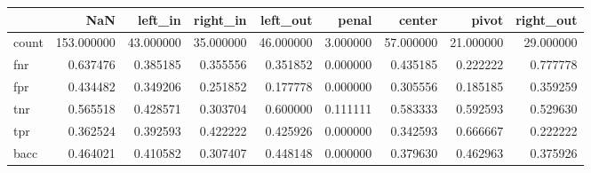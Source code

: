 \begin{tabular}{lrrrrrrrr}
\toprule
{} &         NaN &    left\_in &   right\_in &   left\_out &     penal &     center &      pivot &  right\_out \\
\midrule
count &  153.000000 &  43.000000 &  35.000000 &  46.000000 &  3.000000 &  57.000000 &  21.000000 &  29.000000 \\
fnr   &    0.637476 &   0.385185 &   0.355556 &   0.351852 &  0.000000 &   0.435185 &   0.222222 &   0.777778 \\
fpr   &    0.434482 &   0.349206 &   0.251852 &   0.177778 &  0.000000 &   0.305556 &   0.185185 &   0.359259 \\
tnr   &    0.565518 &   0.428571 &   0.303704 &   0.600000 &  0.111111 &   0.583333 &   0.592593 &   0.529630 \\
tpr   &    0.362524 &   0.392593 &   0.422222 &   0.425926 &  0.000000 &   0.342593 &   0.666667 &   0.222222 \\
bacc  &    0.464021 &   0.410582 &   0.307407 &   0.448148 &  0.000000 &   0.379630 &   0.462963 &   0.375926 \\
\bottomrule
\end{tabular}
